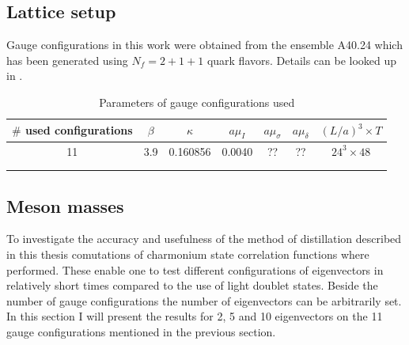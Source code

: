 

\subsection{Lattice setup}
    Gauge configurations in this work were obtained from the ensemble A40.24 which has been generated using $N_f = 2 + 1 + 1$ quark flavors. Details can be looked up in \cite{guage_configurations}.
    
    \begin{table}[h]
        \centering
        \begin{tabular}{lllllll}
        \hline
        \multicolumn{1}{|c|}{$\#$ used configurations} & \multicolumn{1}{c|}{$\beta$} & \multicolumn{1}{c|}{$\kappa$} & \multicolumn{1}{c|}{$a\mu_I$} & \multicolumn{1}{c|}{$a\mu_\sigma$} & \multicolumn{1}{c|}{$a\mu_\delta$} & \multicolumn{1}{c|}{$(L/a)^3 \times T$} \\ \hline
        \multicolumn{1}{|c|}{11} & \multicolumn{1}{c|}{3.9} & \multicolumn{1}{c|}{0.160856} & \multicolumn{1}{c|}{0.0040} & \multicolumn{1}{c|}{??} & \multicolumn{1}{c|}{??} & \multicolumn{1}{c|}{$24^3 \times 48$} \\ \hline
                               &                       &                       &                       &                       &                       &                       \\
                               &                       &                       &                       &                       &                       &                      
        \end{tabular}
        \caption{Parameters of gauge configurations used}
        \label{table_gauge_params}
    \end{table}
    
\subsection{Meson masses}
    To investigate the accuracy and usefulness of the method of distillation described in this thesis comutations of charmonium state correlation functions where performed. These enable one to test different configurations of eigenvectors in relatively short times compared to the use of light doublet states. Beside the number of gauge configurations the number of eigenvectors can be arbitrarily set. In this section I will present the results for 2, 5 and 10 eigenvectors on the 11 gauge configurations mentioned in the previous section.\\
    
